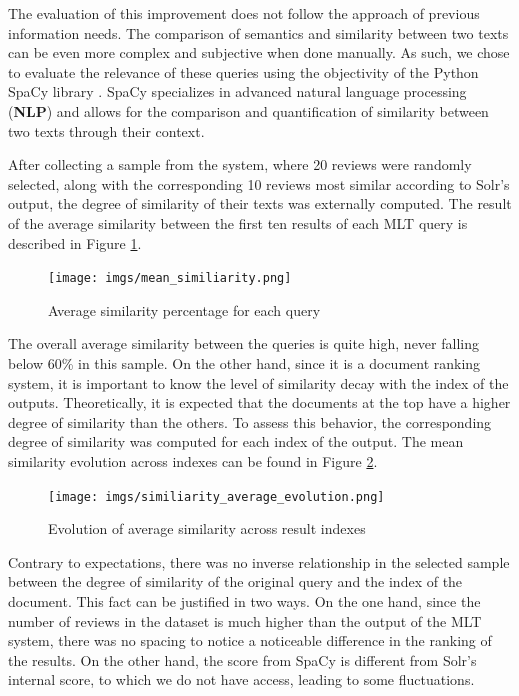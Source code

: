 \documentclass[sigconf]{acmart}
\begin{document}
The evaluation of this improvement does not follow the approach of previous information needs. The comparison of semantics and similarity between two texts can be even more complex and subjective when done manually. As such, we chose to evaluate the relevance of these queries using the objectivity of the Python SpaCy library \cite{Python_Spacy}. SpaCy specializes in advanced natural language processing (\textbf{NLP}) and allows for the comparison and quantification of similarity between two texts through their context.

After collecting a sample from the system, where 20 reviews were randomly selected, along with the corresponding 10 reviews most similar according to Solr's output, the degree of similarity of their texts was externally computed. The result of the average similarity between the first ten results of each MLT query is described in Figure \ref{fig:avg_simi}.

\begin{figure}[h]
  \centering
  \texttt{[image: imgs/mean\_similiarity.png]}
  \caption{Average similarity percentage for each query}
  \label{fig:avg_simi}
\end{figure}

The overall average similarity between the queries is quite high, never falling below 60\% in this sample. On the other hand, since it is a document ranking system, it is important to know the level of similarity decay with the index of the outputs. Theoretically, it is expected that the documents at the top have a higher degree of similarity than the others. To assess this behavior, the corresponding degree of similarity was computed for each index of the output. The mean similarity evolution across indexes can be found in Figure \ref{fig:simi_avg_evo}.


\begin{figure}[h]
  \centering
  \texttt{[image: imgs/similiarity\_average\_evolution.png]}
  \caption{Evolution of average similarity across result indexes}
  \label{fig:simi_avg_evo}
\end{figure}


Contrary to expectations, there was no inverse relationship in the selected sample between the degree of similarity of the original query and the index of the document. This fact can be justified in two ways. On the one hand, since the number of reviews in the dataset is much higher than the output of the MLT system, there was no spacing to notice a noticeable difference in the ranking of the results. On the other hand, the score from SpaCy is different from Solr's internal score, to which we do not have access, leading to some fluctuations.
\end{document}

